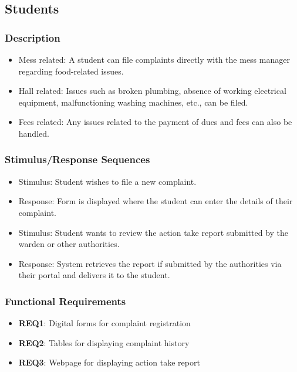 \documentclass{scrreprt}
\begin{document}
\subsection{Students}
\subsubsection{Description}
\begin{itemize}
    \item Mess related: A student can file complaints directly with the mess manager regarding food-related issues. 
    \item Hall related: Issues such as broken plumbing, absence of working electrical equipment, malfunctioning washing machines, etc., can be filed.
    \item Fees related: Any issues related to the payment of dues and fees can also be handled.
\end{itemize}
\subsubsection{Stimulus/Response Sequences}
\begin{itemize}
    \item Stimulus: Student wishes to file a new complaint.
    \item Response: Form is displayed where the student can enter the details of their complaint.
\end{itemize}
\begin{itemize}
    \item Stimulus: Student wants to review the action take report submitted by the warden or other authorities. 
    \item Response: System retrieves the report if submitted by the authorities via their portal and delivers it to the student.
\end{itemize}
\subsubsection{Functional Requirements}
\begin{itemize}
    \item \textbf{REQ1}: Digital forms for complaint registration
    \item \textbf{REQ2}: Tables for displaying complaint history
    \item \textbf{REQ3}: Webpage for displaying action take report
\end{itemize}
\end{document}
